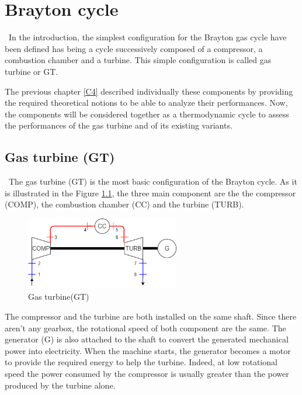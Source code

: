 \graphicspath{{Chapitre_5/Images/}}
\chapter{Brayton cycle}\label{C5}
\quad\, In the introduction, the simplest configuration for the Brayton gas cycle have been defined has being a cycle successively composed of a compressor, a combustion chamber and a turbine. This simple configuration is called gas turbine or GT. 

The previous chapter \ref{C4} described individually these components by providing the required theoretical notions to be able to analyze their performances. Now, the components will be considered together as a thermodynamic cycle to assess the performances of the gas turbine and of its existing variants.

\section{Gas turbine (GT)}
\quad\, The gas turbine (GT) is the most basic configuration of the Brayton cycle. As it is illustrated in the Figure \ref{fig:C5_BraytonGT}, the three main component are the the compressor (COMP), the combustion chamber (CC) and the turbine (TURB).

\begin{figure}[h]
\centering
\includegraphics[width=0.6\textwidth] {GT}
\caption{Gas turbine(GT)}
\label{fig:C5_BraytonGT}
\end{figure}

The compressor and the turbine are both installed on the same shaft. Since there aren't any gearbox, the rotational speed of both component are the same. The generator (G) is also attached to the shaft to convert the generated mechanical power into electricity. 
When the machine starts, the generator becomes a motor to provide the required energy to help the turbine. Indeed, at low rotational speed the power consumed by the compressor is usually greater than the power produced by the turbine alone. 



